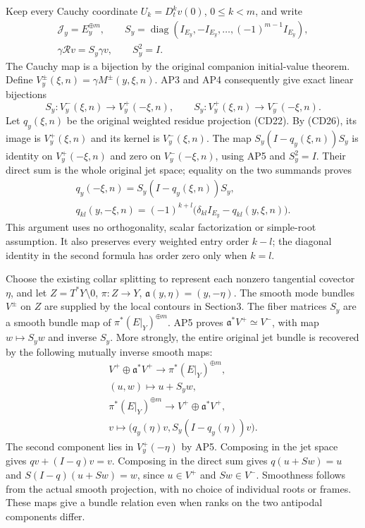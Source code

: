 \documentclass[
  11pt,
]{article}
\begin{document}
Keep every Cauchy coordinate \(U_k=D_t^kv(0)\), \(0\leq k<m\), and write
\[
 \begin{gathered}
 \mathcal J_y=E_y^{\oplus m},\qquad
 S_y=\operatorname{diag}(I_{E_y},-I_{E_y},\ldots,(-1)^{m-1}I_{E_y}),\\
 \gamma\mathscr Rv=S_y\gamma v,\qquad S_y^2=I.
 \end{gathered}
 \tag{AP4}
\] The Cauchy map is a bijection by the original companion initial-value
theorem. Define \(V_y^\pm(\xi,n)=\gamma M^\pm(y,\xi,n)\). AP3 and AP4
consequently give exact linear bijections \[
 S_y:V_y^-(\xi,n)\longrightarrow V_y^+(-\xi,n),\qquad
 S_y:V_y^+(\xi,n)\longrightarrow V_y^-(-\xi,n).
 \tag{AP5}
\] Let \(q_y(\xi,n)\) be the original weighted residue projection
(CD22). By (CD26), its image is \(V_y^+(\xi,n)\) and its kernel is
\(V_y^-(\xi,n)\). The map \(S_y(I-q_y(\xi,n))S_y\) is identity on
\(V_y^+(-\xi,n)\) and zero on \(V_y^-(-\xi,n)\), using AP5 and
\(S_y^2=I\). Their direct sum is the whole original jet space; equality
on the two summands proves \[
 \begin{gathered}
 q_y(-\xi,n)=S_y(I-q_y(\xi,n))S_y,\\
 q_{kl}(y,-\xi,n)=(-1)^{k+l}\big(\delta_{kl}I_{E_y}-q_{kl}(y,\xi,n)\big).
 \end{gathered}
 \tag{AP6}
\] This argument uses no orthogonality, scalar factorization or
simple-root assumption. It also preserves every weighted entry order
\(k-l\); the diagonal identity in the second formula has order zero only
when \(k=l\).

Choose the existing collar splitting to represent each nonzero
tangential covector \(\eta\), and let \(Z=T^*Y\setminus0\),
\(\pi:Z\to Y\), \(\mathfrak a(y,\eta)=(y,-\eta)\). The smooth mode
bundles \(V^\pm\) on \(Z\) are supplied by the local contours in
Section3. The fiber matrices \(S_y\) are a smooth bundle map of
\(\pi^*(E|_Y)^{\oplus m}\). AP5 proves \(\mathfrak a^*V^+\simeq V^-\),
with map \(w\mapsto S_yw\) and inverse \(S_y\). More strongly, the
entire original jet bundle is recovered by the following mutually
inverse smooth maps: \[
 \begin{gathered}
 V^+\oplus\mathfrak a^*V^+\longrightarrow\pi^*(E|_Y)^{\oplus m},\\
       (u,w)\longmapsto u+S_yw,\\
 \pi^*(E|_Y)^{\oplus m}\longrightarrow V^+\oplus\mathfrak a^*V^+,\\
       v\longmapsto\big(q_y(\eta)v,S_y(I-q_y(\eta))v\big).
 \end{gathered}
 \tag{AP7}
\] The second component lies in \(V_y^+(-\eta)\) by AP5. Composing in
the jet space gives \(qv+(I-q)v=v\). Composing in the direct sum gives
\(q(u+Sw)=u\) and \(S(I-q)(u+Sw)=w\), since \(u\in V^+\) and
\(Sw\in V^-\). Smoothness follows from the actual smooth projection,
with no choice of individual roots or frames. These maps give a bundle
relation even when ranks on the two antipodal components differ.
\end{document}
